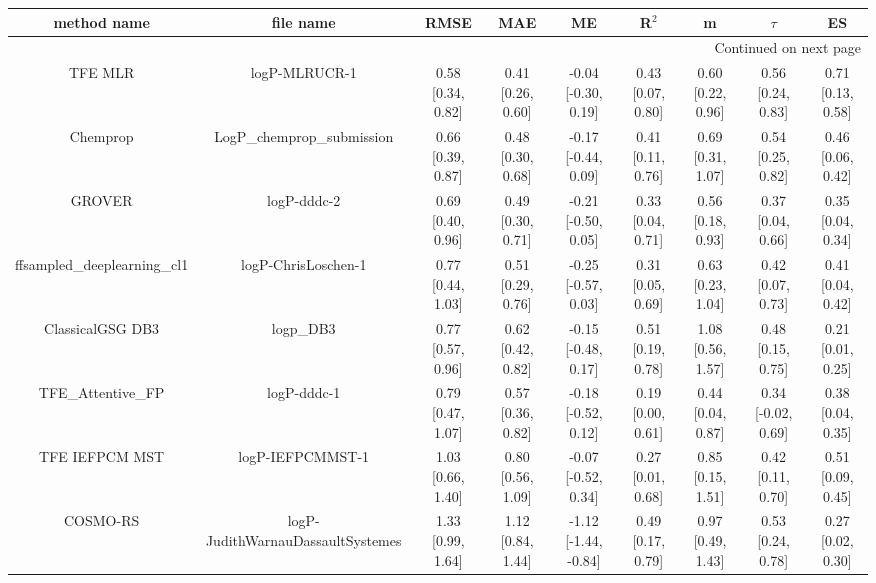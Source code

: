 \documentclass{article}
\begin{document}
\begin{center}
\scriptsize
\begin{longtable}{|ccccccccc|}
\toprule
                method name &                                   file name &               RMSE &                MAE &                    ME &              R$^2$ &                     m &                $\tau$ &                    ES \\
\midrule
\endhead
\midrule
\multicolumn{9}{r}{{Continued on next page}} \\
\midrule
\endfoot

\bottomrule
\endlastfoot
                    TFE MLR &                               logP-MLRUCR-1 &  0.58 [0.34, 0.82] &  0.41 [0.26, 0.60] &   -0.04 [-0.30, 0.19] &  0.43 [0.07, 0.80] &     0.60 [0.22, 0.96] &     0.56 [0.24, 0.83] &     0.71 [0.13, 0.58] \\
                   Chemprop &                  LogP\_chemprop\_submission &  0.66 [0.39, 0.87] &  0.48 [0.30, 0.68] &   -0.17 [-0.44, 0.09] &  0.41 [0.11, 0.76] &     0.69 [0.31, 1.07] &     0.54 [0.25, 0.82] &     0.46 [0.06, 0.42] \\
                     GROVER &                                 logP-dddc-2 &  0.69 [0.40, 0.96] &  0.49 [0.30, 0.71] &   -0.21 [-0.50, 0.05] &  0.33 [0.04, 0.71] &     0.56 [0.18, 0.93] &     0.37 [0.04, 0.66] &     0.35 [0.04, 0.34] \\
 ffsampled_deeplearning_cl1 &                         logP-ChrisLoschen-1 &  0.77 [0.44, 1.03] &  0.51 [0.29, 0.76] &   -0.25 [-0.57, 0.03] &  0.31 [0.05, 0.69] &     0.63 [0.23, 1.04] &     0.42 [0.07, 0.73] &     0.41 [0.04, 0.42] \\
           ClassicalGSG DB3 &                                   logp\_DB3 &  0.77 [0.57, 0.96] &  0.62 [0.42, 0.82] &   -0.15 [-0.48, 0.17] &  0.51 [0.19, 0.78] &     1.08 [0.56, 1.57] &     0.48 [0.15, 0.75] &     0.21 [0.01, 0.25] \\
           TFE_Attentive_FP &                                 logP-dddc-1 &  0.79 [0.47, 1.07] &  0.57 [0.36, 0.82] &   -0.18 [-0.52, 0.12] &  0.19 [0.00, 0.61] &     0.44 [0.04, 0.87] &    0.34 [-0.02, 0.69] &     0.38 [0.04, 0.35] \\
             TFE IEFPCM MST &                            logP-IEFPCMMST-1 &  1.03 [0.66, 1.40] &  0.80 [0.56, 1.09] &   -0.07 [-0.52, 0.34] &  0.27 [0.01, 0.68] &     0.85 [0.15, 1.51] &     0.42 [0.11, 0.70] &     0.51 [0.09, 0.45] \\
                   COSMO-RS &           logP-JudithWarnauDassaultSystemes &  1.33 [0.99, 1.64] &  1.12 [0.84, 1.44] &  -1.12 [-1.44, -0.84] &  0.49 [0.17, 0.79] &     0.97 [0.49, 1.43] &     0.53 [0.24, 0.78] &     0.27 [0.02, 0.30] \\

\end{longtable}
\end{center}
\end{document}
